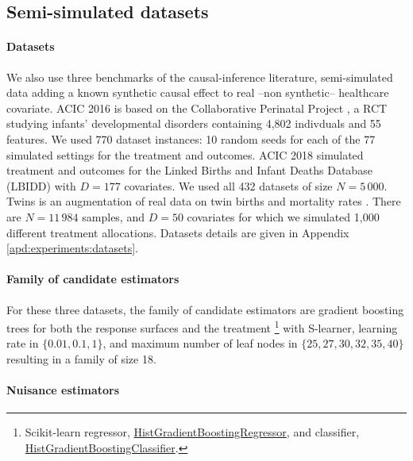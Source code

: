 \documentclass[10pt,twocolumn]{article}
\begin{document}
\subsection{Semi-simulated datasets}

\paragraph{Datasets}\label{semi_simulated:datasets}

We also use three benchmarks of the causal-inference literature, semi-simulated
data adding a known synthetic causal effect to real --non synthetic-- healthcare
covariate. ACIC 2016 \cite{dorie_automated_2019} is based on the Collaborative
Perinatal Project \cite{niswander_women_1972}, a RCT studying infants’
developmental disorders containing 4,802 indivduals and 55 features. We used 770
dataset instances: 10 random seeds for each of the 77 simulated settings for the
treatment and outcomes.  ACIC 2018 \cite{shimoni_benchmarking_2018} simulated
treatment and outcomes for the Linked Births and Infant Deaths Database (LBIDD)
\cite{macdorman_infant_1998} with $D=177$ covariates. We used all 432 datasets
of size $N=5\,000$.  Twins \cite{louizos_causal_2017} is an augmentation of real
data on twin births and mortality rates \cite{almond_costs_2005}. There are
$N=11\,984$ samples, and $D=50$ covariates for which we simulated 1,000
different treatment allocations. Datasets details are given in Appendix
\ref{apd:experiments:datasets}.


\paragraph{Family of candidate
    estimators}\label{semi_simulated:candidate_estimators}

For these three datasets, the family of candidate estimators are gradient
boosting trees for both the response surfaces and the treatment
\footnote{Scikit-learn regressor,
    \href{https://scikit-learn.org/stable/modules/generated/sklearn.ensemble.HistGradientBoostingRegressor.html}{HistGradientBoostingRegressor},
    and classifier,
    \href{https://scikit-learn.org/stable/modules/generated/sklearn.ensemble.HistGradientBoostingClassifier.html}{HistGradientBoostingClassifier}.}
with S-learner, learning rate
in $\{0.01, 0.1, 1\}$, and maximum number of leaf nodes in $\{25, 27, 30, 32,
    35, 40\}$ resulting in a family of size 18.

\paragraph{Nuisance estimators}
\end{document}
